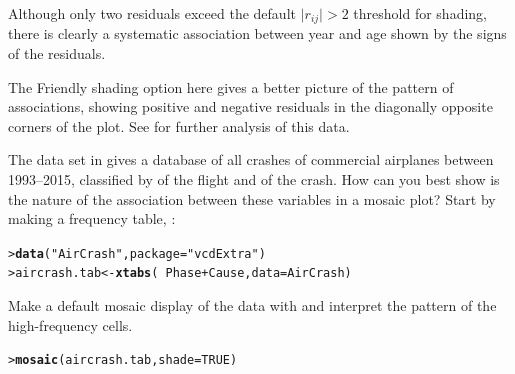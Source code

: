 \documentclass[10pt]{report}\usepackage[]{graphicx}\usepackage[]{color}
\makeatletter
\newcommand{\hlnum}[1]{\textcolor[rgb]{0.686,0.059,0.569}{#1}}%
\newcommand{\hlstr}[1]{\textcolor[rgb]{0.192,0.494,0.8}{#1}}%
\newcommand{\hlopt}[1]{\textcolor[rgb]{0,0,0}{#1}}%
\newcommand{\hlstd}[1]{\textcolor[rgb]{0.345,0.345,0.345}{#1}}%
\newcommand{\hlkwb}[1]{\textcolor[rgb]{0.69,0.353,0.396}{#1}}%
\newcommand{\hlkwc}[1]{\textcolor[rgb]{0.333,0.667,0.333}{#1}}%
\newcommand{\hlkwd}[1]{\textcolor[rgb]{0.737,0.353,0.396}{\textbf{#1}}}%
\newenvironment{kframe}{%
 \def\at@end@of@kframe{}%
 \ifinner\ifhmode%
  \def\at@end@of@kframe{\end{minipage}}%
  \begin{minipage}{\columnwidth}%
 \fi\fi%
 \def\FrameCommand##1{\hskip\@totalleftmargin \hskip-\fboxsep
 \colorbox{shadecolor}{##1}\hskip-\fboxsep
     \hskip-\linewidth \hskip-\@totalleftmargin \hskip\columnwidth}%
 \MakeFramed {\advance\hsize-\width
   \@totalleftmargin\z@ \linewidth\hsize
   \@setminipage}}%
 {\par\unskip\endMakeFramed%
 \at@end@of@kframe}
\newenvironment{knitrout}{}{} %
\renewenvironment{knitrout}{\small\renewcommand{\baselinestretch}{.85}}{} %
\makeatother
\begin{document}
\begin{Exercises}
\begin{enumerate*}
\begin{ans}
\begin{knitrout}
\end{knitrout}
    Although only two residuals exceed the default $\vert r_{ij} \vert > 2$
    threshold for shading, there is clearly a systematic association between
    year and age shown by the signs of the residuals.
    
    The Friendly shading option here gives a better picture of the pattern of
    associations, showing positive and negative residuals in the diagonally
    opposite corners of the plot.  See  for further
    analysis of this data.
    \end{ans}
    
  \end{enumerate*}

\exercise\label{lab:mosaic-crash} The data set  in  gives a database of all crashes of commercial airplanes
between 1993--2015, classified by  of the flight and  of the crash.  How can you best show is the nature of the
association between these variables in a mosaic plot?  Start by making a frequency table, :
\begin{knitrout}\footnotesize
{}\color{fgcolor}\begin{kframe}
\begin{alltt}
\hlstd{> }\hlkwd{data}\hlstd{(}\hlstr{"AirCrash"}\hlstd{,} \hlkwc{package} \hlstd{=} \hlstr{"vcdExtra"}\hlstd{)}
\hlstd{> }\hlstd{aircrash.tab} \hlkwb{<-} \hlkwd{xtabs}\hlstd{(}\hlopt{~} \hlstd{Phase} \hlopt{+} \hlstd{Cause,} \hlkwc{data} \hlstd{= AirCrash)}
\end{alltt}
\end{kframe}
\end{knitrout}
  \begin{enumerate*}
    \item Make a default mosaic display of the data with  and interpret the pattern of the high-frequency cells.
    \begin{ans}
\begin{knitrout}\footnotesize
{}\color{fgcolor}\begin{kframe}
\begin{alltt}
\hlstd{> } \hlkwd{mosaic}\hlstd{(aircrash.tab,} \hlkwc{shade}\hlstd{=}\hlnum{TRUE}\hlstd{)}
\end{alltt}
\end{kframe}


\end{knitrout}
\end{ans}
\end{enumerate*}
\end{Exercises}
\end{document}
